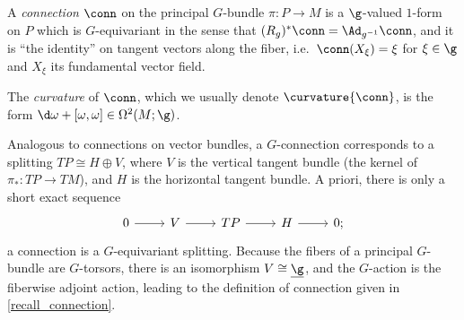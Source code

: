\begin{recall}
\label{recall_connection}
  A \textit{connection} $\conn$ on the principal $G$-bundle $\pi\colon P\to M$ is a $\g$-valued $1$-form on $P$
  which is $G$-equivariant in the sense that $(R_g)^*\conn =\Ad_{g^{-1}}\conn$, and it
  is ``the identity'' on tangent vectors along the fiber, i.e.\ $\conn(X_{\xi})=\xi$ for $\xi\in\g$ and $X_{\xi}$ its
  fundamental vector field.

  The \textit{curvature} of $\conn$, which we usually denote $\curvature{\conn}$, is the form $\d\omega + [\omega,
  \omega]\in\Omega^2(M;\g)$.
\end{recall}
Analogous to connections on vector bundles, a $G$-connection corresponds to a splitting $TP\cong H\oplus V$, where
$V$ is the vertical tangent bundle (the kernel of $\pi_*\colon TP\to TM$), and $H$ is the horizontal tangent
bundle. A priori, there is only a short exact sequence
\begin{equation}
	\begin{tikzcd}[ampersand replacement=\&]
        0 \& V
        \&  TP
        \& H
        \& 0;
        \arrow[from=1-1, to=1-2]
        \arrow[from=1-2, to=1-3]
        \arrow[from=1-3, to=1-4]
        \arrow[from=1-4, to=1-5]
\end{tikzcd}
\end{equation}
a connection is a $G$-equivariant splitting. Because the fibers of a principal $G$-bundle are $G$-torsors,
there is an isomorphism $V\cong\underline{\g}$, and the $G$-action is the fiberwise adjoint action, leading to the
definition of connection given in \ref{recall_connection}.

